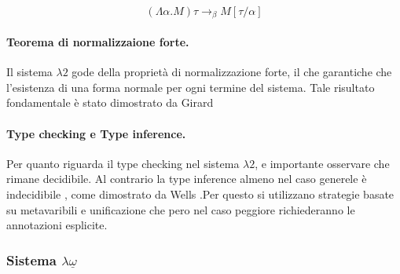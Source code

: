 \begin{equation}
    (\Lambda \alpha. M) \tau \to_\beta M[\tau / \alpha]
    \label{eq:system_f_beta_reduction}
\end{equation}

\paragraph{Teorema di normalizzaione forte.}
Il sistema $\lambda 2$ gode della proprietà di normalizzazione forte, il che garantiche che l'esistenza di una forma normale
per ogni termine del sistema. Tale risultato fondamentale è stato dimostrato da Girard \cite{Girard1989}

\paragraph{Type checking e Type inference.} 
Per quanto riguarda il type checking nel sistema $\lambda 2$, e importante osservare che rimane decidibile. Al contrario
la type inference almeno nel caso generele è indecidibile , come dimostrato da Wells \cite{wells1994}.Per questo si utilizzano strategie basate su metavaribili e unificazione
che pero nel caso peggiore richiederanno le annotazioni esplicite.

\subsubsection{Sistema \texorpdfstring{$\lambda\underline{\omega}$}{Lambda-omega-under}}

